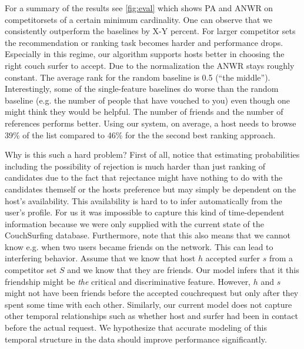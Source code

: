 For a summary of the results see \autoref{fig:eval} which shows PA and ANWR on competitorsets of a certain minimum cardinality. One can observe that we consistently outperform the baselines by X-Y percent. For larger competitor sets the recommendation or ranking task becomes harder and performance drops. Especially in this regime, our algorithm supports hosts better in choosing the right couch surfer to accept. Due to the normalization the ANWR stays roughly constant. The average rank for the random baseline is 0.5 (``the middle''). Interestingly, some of the single-feature baselines do worse than the random baseline (e.g. the number of people that have vouched to you) even though one might think they would be helpful. The number of friends and the number of references performs better. Using our system, on average, a host needs to browse 39\% of the list compared to 46\% for the the second best ranking approach.

Why is this such a hard problem? First of all, notice that estimating probabilities including the possibility of rejection is much harder than just ranking of candidates due to the fact that rejectance might have nothing to do with the candidates themself or the hosts preference but may simply be dependent on the host's availability. This availability is hard to to infer automatically from the user's profile. For us it was impossible to capture this kind of time-dependent information because we were only supplied with the current state of the CouchSurfing database. Furthermore, note that this also means that we cannot know e.g. when two users became friends on the network. This can lead to interfering behavior. Assume that we know that host $h$ accepted surfer $s$ from  a competitor set $S$ and we know that they are friends. Our model infers that it this friendship might be \textit{the} critical and discriminative feature. However, $h$ and $s$ might not have been friends before the accepted couchrequest but only after they spent some time with each other. Similarly, our current model does not capture other temporal relationships such as whether host and surfer had been in contact before the actual request. We hypothesize that accurate modeling of this temporal structure in the data should improve performance significantly.

